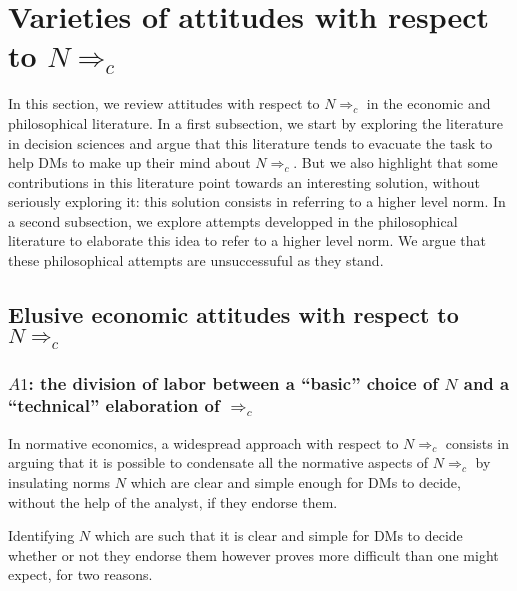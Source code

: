 \documentclass[preprint, french, english, 11pt, authoryear]{elsarticle}%
\newcommand{\protectforpdf}[1]{\texorpdfstring{\ensuremath{#1}}{#1}}
\begin{document}
\section{Varieties of attitudes with respect to \protectforpdf{N ⇒_c}}
\label{sec:existing}
In this section, we review attitudes with respect to $N ⇒_c$ in the economic and philosophical literature. In a first subsection, we start by exploring the literature in decision sciences and argue that this literature tends to evacuate the task to help \acp{DM} to make up their mind about $N ⇒_c$. But we also highlight that some contributions in this literature point towards an interesting solution, without seriously exploring it: this solution consists in referring to a higher level norm. In a second subsection, we explore attempts developped in the philosophical literature to elaborate this idea to refer to a higher level norm. We argue that these philosophical attempts are unsuccessuful as they stand.

\subsection{Elusive economic attitudes with respect to \protectforpdf{N ⇒_c}}
\subsubsection{\protectforpdf{A1}: the division of labor between a ``basic'' choice of \protectforpdf{N} and a ``technical'' elaboration of \protectforpdf{⇒_c}}

In normative economics, a widespread approach with respect to $N ⇒_c$ consists in arguing that it is possible to condensate all the normative aspects of $N ⇒_c$  by insulating norms $N$ which are clear and simple enough for \acp{DM} to decide, without the help of the analyst, if they endorse them.

Identifying $N$ which are such that it is clear and simple for \acp{DM} to decide whether or not they endorse them however proves more difficult than one might expect, for two reasons.
\end{document}
